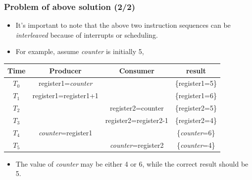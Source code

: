 \documentclass[CJKutf8,xcolor=pdftex,dvipsnames,table]{beamer}
\begin{document}
\begin{CJK*}{UTF8}{song}
\begin{frame}[fragile]
\end{frame}

  \begin{frame}
  \frametitle{Problem of above solution (2/2)} \pause
  \begin{itemize}
  \item{It's important to note that the above two instruction sequences can be \emph{interleaved} because of interrupts or scheduling.} \pause
  \item{For example, assume \textit{counter} is initially 5,} \pause
  \end{itemize}
  \begin{tabular}{c|c|c|c}
    Time & Producer                & Consumer              & result\\
    \hline \pause
    $T_0$   & register1=\textit{counter}       &                       & \{register1=5\}\\ \pause
    $T_1$   & register1=register1+1   &                       & \{register1=6\}\\ \pause
    $T_2$   &                         & register2=counter     & \{register2=5\}\\ \pause
    $T_3$   &                         & register2=register2-1 & \{register2=4\}\\ \pause
    $T_4$   & \textit{counter}=register1       &                       & \{\textit{counter}=6\}\\   \pause
    $T_5$   &  & \textit{counter}=register2     & \{\textit{counter}=\color{red}4\color{black}\}     \pause
  \end{tabular}
  \begin{itemize}
  \item{The value of \textit{counter} may be either 4 or 6, while the correct result should be 5.}
  \end{itemize}
  \end{frame}


\end{CJK*}
\end{document}

